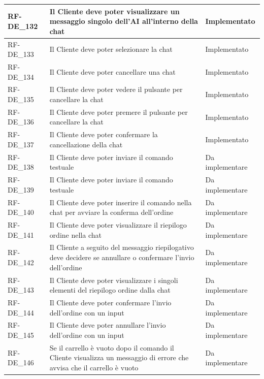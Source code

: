 \begin{longtable}{|>{\raggedright}p{}|>{\raggedright\arraybackslash}p{}|>{\raggedright\arraybackslash}p{}|}
	\hline
	RF-DE\_132 \hypertarget{rf-de_132} & Il Cliente deve poter visualizzare un messaggio singolo dell'AI all'interno della chat & Implementato \\
	\hline
	RF-DE\_133 \hypertarget{rf-de_133} & Il Cliente deve poter selezionare la chat & Implementato \\
	\hline
	RF-DE\_134 \hypertarget{rf-de_134} & Il Cliente deve poter cancellare una chat & Implementato \\
	\hline
	RF-DE\_135 \hypertarget{rf-de_135} & Il Cliente deve poter vedere il pulsante per cancellare la chat & Implementato \\
	\hline
	RF-DE\_136 \hypertarget{rf-de_136} & Il Cliente deve poter premere il pulsante per cancellare la chat & Implementato \\
	\hline
	RF-DE\_137 \hypertarget{rf-de_137} & Il Cliente deve poter confermare la cancellazione della chat & Implementato \\
	\hline
	RF-DE\_138 \hypertarget{rf-de_138} & Il Cliente deve poter inviare il comando testuale \vr{/carrello} & Da implementare  \\
	\hline
	RF-DE\_139 \hypertarget{rf-de_139} & Il Cliente deve poter inviare il comando testuale \vr{/carrello} & Da implementare  \\
	\hline
	RF-DE\_140 \hypertarget{rf-de_140} & Il Cliente deve poter inserire il comando \vr{/invia} nella chat per avviare la conferma dell'ordine & Da implementare \\
	\hline
	RF-DE\_141 \hypertarget{rf-de_141} & Il Cliente deve poter visualizzare il riepilogo ordine nella chat & Da implementare \\
	\hline
	RF-DE\_142 \hypertarget{rf-de_142} & Il Cliente a seguito del messaggio riepilogativo deve decidere se annullare o confermare l'invio dell'ordine & Da implementare \\
	\hline
	RF-DE\_143 \hypertarget{rf-de_143} & Il Cliente deve poter visualizzare i singoli elementi del riepilogo ordine dalla chat & Da implementare \\
	\hline
	RF-DE\_144 \hypertarget{rf-de_144} & Il Cliente deve poter confermare l'invio dell'ordine con un input & Da implementare \\
	\hline
	RF-DE\_145 \hypertarget{rf-de_145} & Il Cliente deve poter annullare l'invio dell'ordine con un input & Da implementare \\
	\hline
	RF-DE\_146 \hypertarget{rf-de_146} & Se il carrello è vuoto dopo il comando \vr{/invia} il Cliente visualizza un messaggio di errore che avvisa che il carrello è vuoto & Da implementare \\

\end{longtable}
